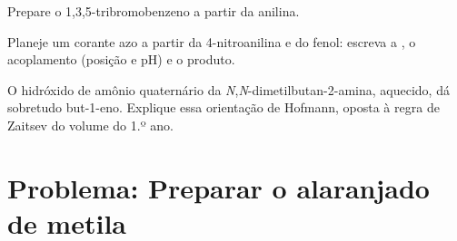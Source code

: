 \begin{exercise}[$\star\star\star$]\label{exo:b2:amines:10}
Prepare o 1,3,5-tribromobenzeno a partir da anilina.
\end{exercise}

\begin{exercise}[$\star\star\star$]\label{exo:b2:amines:11}
Planeje um corante azo a partir da 4-nitroanilina e do fenol: escreva a
, o acoplamento (posição e pH) e o produto.
\end{exercise}

\begin{exercise}[$\star\star\star$]\label{exo:b2:amines:12}
O hidróxido de amônio quaternário da \textit{N},\textit{N}-dimetilbutan-2-amina,
aquecido, dá sobretudo but-1-eno. Explique essa orientação de Hofmann, oposta
à regra de Zaitsev do volume do 1.º ano.
\end{exercise}

\section{Problema: Preparar o alaranjado de metila}

